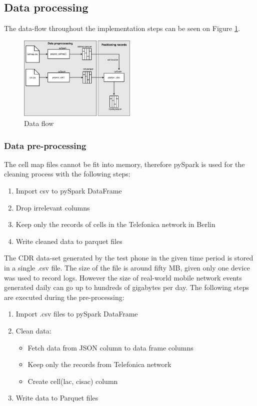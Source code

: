 \subsection{Data processing}\label{sec:data-proc}
The data-flow throughout the implementation steps can be seen on Figure \ref{fig:data-flow}.
\begin{figure}[h]
    \centering
    \includegraphics[width=0.5\textwidth]{images/data-flow.png}
    \caption{Data flow}
    \label{fig:data-flow}
\end{figure}

\subsubsection{Data pre-processing}
The cell map files cannot be fit into memory, therefore pySpark is used for the cleaning process with the following steps: 
\begin{enumerate}
    \item Import csv to pySpark DataFrame
    \item Drop irrelevant columns
    \item Keep only the records of cells in the Telefonica network in Berlin
    \item Write cleaned data to parquet files
\end{enumerate}

The CDR data-set generated by the test phone in the given time period is stored in a single .csv file. The size of the file is around fifty MB, given only one device was used to record logs. However the size of real-world mobile network events generated daily can go up to hundreds of gigabytes per day. The following steps are executed during the pre-processing: 
\begin{enumerate}
   \item Import .csv files to pySpark DataFrame
    \item Clean data:
    \begin{itemize}
        \item Fetch data from JSON column to data frame columns
        \item Keep only the records from Telefonica network
        \item Create cell(lac, cisac) column
    \end{itemize}
    \item Write data to Parquet files
\end{enumerate}

